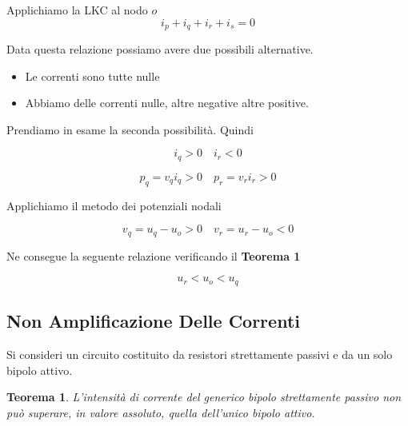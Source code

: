 \documentclass[a4paper]{report}
\newtheorem{definizione}{Teorema}
\begin{document}
Applichiamo la LKC al nodo $o$
\[
i_p+i_q+i_r+i_s=0
\]

Data questa relazione possiamo avere due possibili alternative.

\begin{itemize}
\item Le correnti sono tutte nulle
\item Abbiamo delle correnti nulle, altre negative altre positive.
\end{itemize}

Prendiamo in esame la seconda possibilit\`a. Quindi

\[
i_q>0 \quad i_r<0
\]

\[
p_q=v_qi_q>0 \quad p_r=v_ri_r>0
\]

Applichiamo il metodo dei potenziali nodali

\[
v_q=u_q-u_o>0 \quad v_r=u_r-u_o<0
\]

Ne consegue la seguente relazione verificando il {\bf Teorema 1}

\[
u_r<u_o<u_q
\]

\subsection{Non Amplificazione Delle Correnti}
\label{subsec:nonAmplC}
Si consideri un circuito costituito da resistori strettamente passivi e
da un solo bipolo attivo.
\begin{definizione}
  L'intensit\`a di corrente del generico bipolo strettamente passivo
  non pu\`o superare, in valore assoluto, quella dell'unico bipolo attivo.
\end{definizione}
\end{document}
